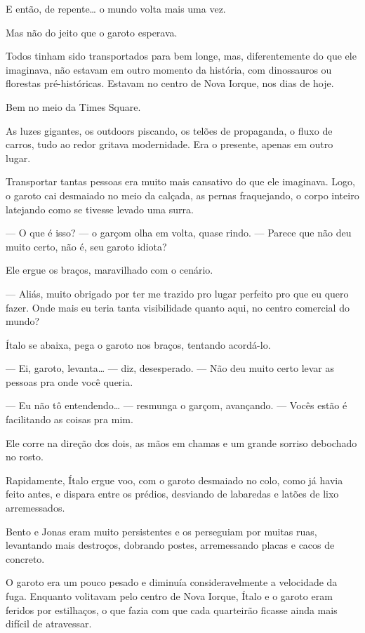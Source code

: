 E então, de repente… o mundo volta mais uma vez.

Mas não do jeito que o garoto esperava.

Todos tinham sido transportados para bem longe, mas, diferentemente do que ele imaginava, não estavam em outro momento da história, com dinossauros ou florestas pré-históricas.
Estavam no centro de Nova Iorque, nos dias de hoje.

Bem no meio da Times Square.

As luzes gigantes, os outdoors piscando, os telões de propaganda, o fluxo de carros, tudo ao redor gritava modernidade.  
Era o presente, apenas em outro lugar.

Transportar tantas pessoas era muito mais cansativo do que ele imaginava.  
Logo, o garoto cai desmaiado no meio da calçada, as pernas fraquejando, o corpo inteiro latejando como se tivesse levado uma surra.

— O que é isso? — o garçom olha em volta, quase rindo. — Parece que não deu muito certo, não é, seu garoto idiota?

Ele ergue os braços, maravilhado com o cenário.

— Aliás, muito obrigado por ter me trazido pro lugar perfeito pro que eu quero fazer.  
Onde mais eu teria tanta visibilidade quanto aqui, no centro comercial do mundo?

Ítalo se abaixa, pega o garoto nos braços, tentando acordá-lo.

— Ei, garoto, levanta… — diz, desesperado. — Não deu muito certo levar as pessoas pra onde você queria.

— Eu não tô entendendo… — resmunga o garçom, avançando. — Vocês estão é facilitando as coisas pra mim.

Ele corre na direção dos dois, as mãos em chamas e um grande sorriso debochado no rosto.

Rapidamente, Ítalo ergue voo, com o garoto desmaiado no colo, como já havia feito antes, e dispara entre os prédios, desviando de labaredas e latões de lixo arremessados.

Bento e Jonas eram muito persistentes e os perseguiam por muitas ruas, levantando mais destroços, dobrando postes, arremessando placas e cacos de concreto.

O garoto era um pouco pesado e diminuía consideravelmente a velocidade da fuga.  
Enquanto volitavam pelo centro de Nova Iorque, Ítalo e o garoto eram feridos por estilhaços, o que fazia com que cada quarteirão ficasse ainda mais difícil de atravessar.


